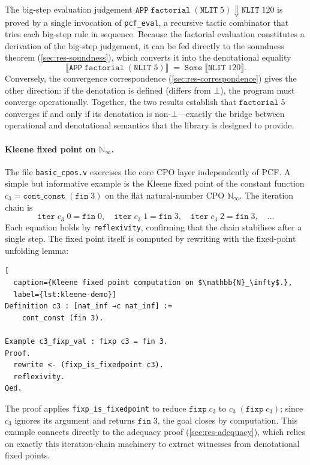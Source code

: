 The big-step evaluation judgement
$\texttt{APP}\;\texttt{factorial}\;(\texttt{NLIT}\;5) \Downarrow
\texttt{NLIT}\;120$ is proved by a single invocation of
\texttt{pcf\_eval}, a recursive tactic combinator that tries each
big-step rule in sequence.
Because the factorial evaluation constitutes a derivation of the
big-step judgement, it can be fed directly to the soundness theorem
(\cref{sec:res-soundness}), which converts it into the denotational
equality
\[
  \llbracket\texttt{APP}\;\texttt{factorial}\;
  (\texttt{NLIT}\;5)\rrbracket
  \;=\;
  \texttt{Some}\;\llbracket\texttt{NLIT}\;120\rrbracket.
\]
Conversely, the convergence correspondence
(\cref{sec:res-correspondence}) gives the other direction: if the
denotation is defined (differs from $\bot$), the program must converge
operationally.
Together, the two results establish that
$\texttt{factorial}\;5$ converges if and only if its denotation is
non-$\bot$---exactly the bridge between operational and denotational
semantics that the library is designed to provide.

\paragraph{Kleene fixed point on $\mathbb{N}_\infty$.}
The file \texttt{basic\_cpos.v} exercises the core CPO layer
independently of PCF\@.
A simple but informative example is the Kleene fixed point of the
constant function $c_3 = \texttt{cont\_const}\;(\texttt{fin}\;3)$ on
the flat natural-number CPO $\mathbb{N}_\infty$.
The iteration chain is
\[
  \texttt{iter}\;c_3\;0 = \texttt{fin}\;0,\quad
  \texttt{iter}\;c_3\;1 = \texttt{fin}\;3,\quad
  \texttt{iter}\;c_3\;2 = \texttt{fin}\;3,\quad
  \ldots
\]
Each equation holds by \texttt{reflexivity}, confirming that the chain
stabilises after a single step.
The fixed point itself is computed by rewriting with the fixed-point
unfolding lemma:
\begin{lstlisting}[
  caption={Kleene fixed point computation on $\mathbb{N}_\infty$.},
  label={lst:kleene-demo}]
Definition c3 : [nat_inf →c nat_inf] :=
    cont_const (fin 3).

Example c3_fixp_val : fixp c3 = fin 3.
Proof.
  rewrite <- (fixp_is_fixedpoint c3).
  reflexivity.
Qed.
\end{lstlisting}
The proof applies \texttt{fixp\_is\_fixedpoint} to reduce
$\texttt{fixp}\;c_3$ to $c_3\;(\texttt{fixp}\;c_3)$; since $c_3$
ignores its argument and returns $\texttt{fin}\;3$, the goal closes by
computation.
This example connects directly to the adequacy proof
(\cref{sec:res-adequacy}), which relies on exactly this iteration-chain
machinery to extract witnesses from denotational fixed points.

